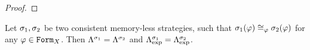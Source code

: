 \begin{proof}
\end{proof}

\begin{corollary}
Let $\sigma_1, \sigma_2$ be two consistent memory-less strategies, such that
  $\sigma_1(\varphi) \cong_{\varphi} \sigma_2(\varphi)$ for any $\varphi\in\mathtt{Form}_X$.
Then $\Lambda^{\sigma_1} = \Lambda^{\sigma_2}$
  and $\Lambda^{\sigma_1}_\textrm{exp} = \Lambda^{\sigma_2}_\textrm{exp}$.
\end{corollary}





